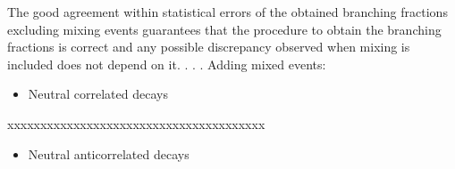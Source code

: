 The good agreement within statistical errors of the obtained branching fractions excluding mixing events guarantees that 
the procedure to obtain the branching fractions is correct and any possible discrepancy observed when mixing is included does not
depend on it.
\newpage
 . . . Adding mixed events:
 \newline
 \begin{itemize}
    \item Neutral correlated decays
\end{itemize}
\begin{table}[H]
    \centering
    \caption{Measured branching fraction values obtained using the results listed in  for the six different streams (only statistical uncertainties are displayed) and its average.}
    \end{table}
    xxxxxxxxxxxxxxxxxxxxxxxxxxxxxxxxxxxxxxx\newline
\begin{itemize}
    \item Neutral anticorrelated decays
\end{itemize}

